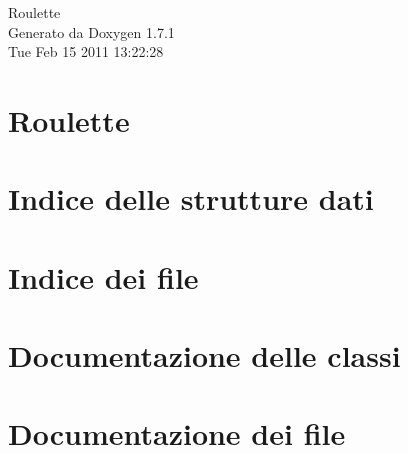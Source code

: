 \documentclass[a4paper]{book}
\begin{document}
\hypersetup{pageanchor=false}
\begin{titlepage}
\vspace*{7cm}
\begin{center}
{\Large Roulette }\\
\vspace*{1cm}
{\large Generato da Doxygen 1.7.1}\\
\vspace*{0.5cm}
{\small Tue Feb 15 2011 13:22:28}\\
\end{center}
\end{titlepage}
\clearemptydoublepage
{}
\tableofcontents
\clearemptydoublepage
{}
\hypersetup{pageanchor=true}
\chapter{Roulette}
\label{index}\hypertarget{index}{}
\chapter{Indice delle strutture dati}

\chapter{Indice dei file}

\chapter{Documentazione delle classi}










\chapter{Documentazione dei file}












\printindex
\end{document}
